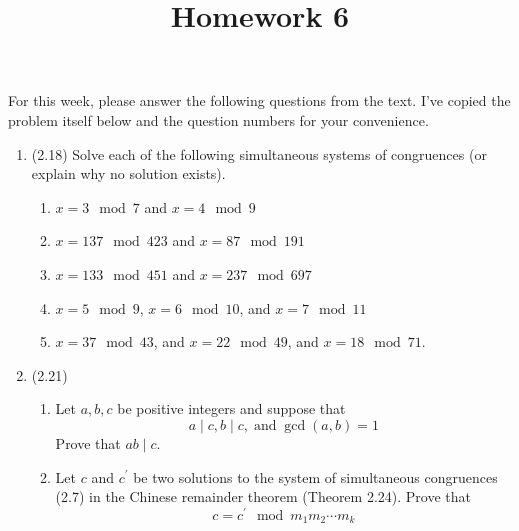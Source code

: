 \documentclass[12pt]{amsart}
\theoremstyle{definition}
\begin{document}
\title{Homework 6}

\maketitle

For this week, please answer the following questions from the text. 
I've copied the problem itself below and the question numbers for 
your convenience. 

\begin{enumerate}
	\item (2.18) Solve each of the following simultaneous systems of 
		congruences (or explain why no solution exists). 
	\begin{enumerate}
		\item $x = 3 \mod 7$ and $x = 4 \mod 9$
		\item $x = 137 \mod 423$ and $x = 87 \mod 191$
		\item $x = 133 \mod 451$ and $x = 237 \mod 697$
		\item $x = 5 \mod 9$, $x = 6 \mod 10$, and $x = 7 \mod 11$
		\item $x = 37 \mod 43$, and $x = 22 \mod 49$, and $x = 
			18 \mod 71$. 
	\end{enumerate}
	\item (2.21) 
	\begin{enumerate}
		\item Let $a,b,c$ be positive integers and suppose that 
		\begin{displaymath}
			a \mid c, b \mid c, \operatorname{and} 
			\operatorname{gcd}(a,b) = 1
		\end{displaymath}
		Prove that $ab \mid c$.
		\item Let $c$ and $c^\prime$ be two solutions to the system of 
			simultaneous congruences (2.7) in the Chinese 
			remainder theorem (Theorem 2.24). Prove that 
		\begin{displaymath}
			c = c^\prime \mod m_1 m_2 \cdots m_k 
		\end{displaymath}
			
	\end{enumerate}
		

\end{enumerate}
\end{document}
